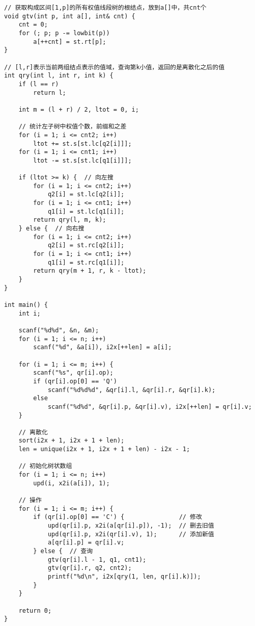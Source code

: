 \begin{lstlisting}
// 获取构成区间[1,p]的所有权值线段树的根结点，放到a[]中，共cnt个
void gtv(int p, int a[], int& cnt) {
    cnt = 0;
    for (; p; p -= lowbit(p))
        a[++cnt] = st.rt[p];
}

// [l,r]表示当前两组结点表示的值域，查询第k小值，返回的是离散化之后的值
int qry(int l, int r, int k) {
    if (l == r)
        return l;

    int m = (l + r) / 2, ltot = 0, i;

    // 统计左子树中权值个数，前缀和之差
    for (i = 1; i <= cnt2; i++)
        ltot += st.s[st.lc[q2[i]]];
    for (i = 1; i <= cnt1; i++)
        ltot -= st.s[st.lc[q1[i]]];

    if (ltot >= k) {  // 向左搜
        for (i = 1; i <= cnt2; i++)
            q2[i] = st.lc[q2[i]];
        for (i = 1; i <= cnt1; i++)
            q1[i] = st.lc[q1[i]];
        return qry(l, m, k);
    } else {  // 向右搜
        for (i = 1; i <= cnt2; i++)
            q2[i] = st.rc[q2[i]];
        for (i = 1; i <= cnt1; i++)
            q1[i] = st.rc[q1[i]];
        return qry(m + 1, r, k - ltot);
    }
}

int main() {
    int i;

    scanf("%d%d", &n, &m);
    for (i = 1; i <= n; i++)
        scanf("%d", &a[i]), i2x[++len] = a[i];

    for (i = 1; i <= m; i++) {
        scanf("%s", qr[i].op);
        if (qr[i].op[0] == 'Q')
            scanf("%d%d%d", &qr[i].l, &qr[i].r, &qr[i].k);
        else
            scanf("%d%d", &qr[i].p, &qr[i].v), i2x[++len] = qr[i].v;
    }

    // 离散化
    sort(i2x + 1, i2x + 1 + len);
    len = unique(i2x + 1, i2x + 1 + len) - i2x - 1;

    // 初始化树状数组
    for (i = 1; i <= n; i++)
        upd(i, x2i(a[i]), 1);

    // 操作
    for (i = 1; i <= m; i++) {
        if (qr[i].op[0] == 'C') {               // 修改
            upd(qr[i].p, x2i(a[qr[i].p]), -1);  // 删去旧值
            upd(qr[i].p, x2i(qr[i].v), 1);      // 添加新值
            a[qr[i].p] = qr[i].v;
        } else {  // 查询
            gtv(qr[i].l - 1, q1, cnt1);
            gtv(qr[i].r, q2, cnt2);
            printf("%d\n", i2x[qry(1, len, qr[i].k)]);
        }
    }

    return 0;
}
\end{lstlisting}